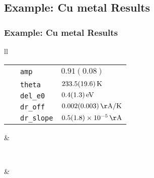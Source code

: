 \subsection{Example: Cu metal Results}
\begin{frame}[fragile] \frametitle{Example: Cu metal Results}

  \begin{tabular}{ll}
    \begin{minipage}{50mm}
      \begin{tabular}{lll}
        {\ } &{\tt{amp}}  &   $0.91(0.08)$ \\
        &{\tt{theta}}  &   $233.5(19.6) \rm\, K $ \\
        &{\tt{del\_e0}}  &   $0.4(1.3) \rm \, eV$ \\
        & {\tt{dr\_off}} &   $0.002(0.003) \rm \, {\AA}/K $ \\
        &{\tt{dr\_slope}}   &    $0.5(1.8)\times 10^{-5} \rm \, {\AA}$ \\
      \end{tabular}
  \vmm
\end{minipage} &
\begin{minipage}{50mm}
\end{minipage} \\
\begin{minipage}{50mm}
\end{minipage} &
\begin{minipage}{50mm}
\end{minipage}\\
\end{tabular}
\end{frame}





